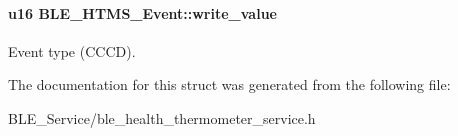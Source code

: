 \paragraph[{\texorpdfstring{write\+\_\+value}{write_value}}]{\setlength{\rightskip}{0pt plus 5cm}u16 B\+L\+E\+\_\+\+H\+T\+M\+S\+\_\+\+Event\+::write\+\_\+value}\hypertarget{struct_b_l_e___h_t_m_s___event_ada3a64fa54a25ef665b62e46cad55a5c}{}\label{struct_b_l_e___h_t_m_s___event_ada3a64fa54a25ef665b62e46cad55a5c}
Event type (C\+C\+CD). 

The documentation for this struct was generated from the following file\+:\begin{DoxyCompactItemize}
\item 
B\+L\+E\+\_\+\+Service/ble\+\_\+health\+\_\+thermometer\+\_\+service.\+h\end{DoxyCompactItemize}
